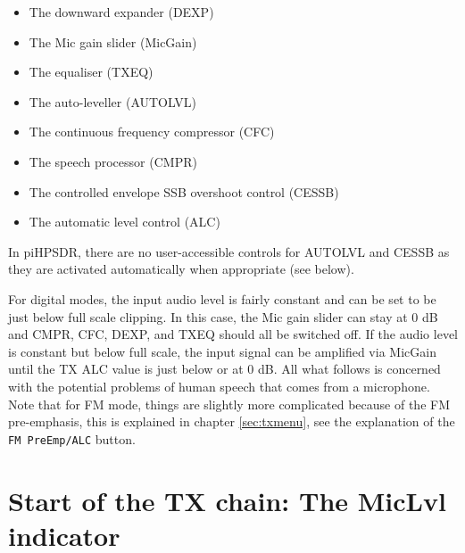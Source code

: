 \documentclass[12pt]{book}
\def\rett#1{\texttt{\color{red}#1}}
\def\pH{pi\-HPSDR\xspace}
\begin{document}
\begin{itemize}
\item{The downward expander (DEXP)}
\item{The Mic gain slider (MicGain)}
\item{The equaliser (TXEQ)}
\item{The auto-leveller (AUTOLVL)}
\item{The continuous frequency compressor (CFC)}
\item{The speech processor (CMPR)}
\item{The controlled envelope SSB overshoot control (CESSB)}
\item{The automatic level control (ALC)}
\end{itemize}

In \pH, there are no user-accessible controls for AUTOLVL and CESSB as they are activated
automatically when appropriate (see below).

For digital modes, the input audio level is fairly constant and can be set to be just below full scale
clipping. In this case, the Mic gain slider can stay at 0 dB and CMPR, CFC, DEXP, and TXEQ should
all be switched off. If the audio level is constant but below full scale, the input signal can be
amplified via MicGain until the TX ALC value is just below or at 0 dB.
All what follows is concerned with the potential problems of human speech
that comes from a microphone. Note that for FM mode, things are slightly more complicated
because of the FM pre-emphasis, this is explained in chapter \ref{sec:txmenu}, see the
explanation of the \rett{FM PreEmp/ALC} button.

\section{Start of the TX chain: The MicLvl indicator}
\end{document}
